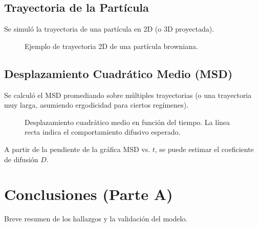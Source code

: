 \documentclass[11pt,a4paper]{article}
\begin{document}
\subsection{Trayectoria de la Partícula}
Se simuló la trayectoria de una partícula en 2D (o 3D proyectada).
\begin{figure}[h!]
    \centering
    \caption{Ejemplo de trayectoria 2D de una partícula browniana.}
    \label{fig:trayectoria}
\end{figure}

\subsection{Desplazamiento Cuadrático Medio (MSD)}
Se calculó el MSD promediando sobre múltiples trayectorias (o una trayectoria muy larga, asumiendo ergodicidad para ciertos regímenes).
\begin{figure}[h!]
    \centering
    \caption{Desplazamiento cuadrático medio en función del tiempo. La línea recta indica el comportamiento difusivo esperado.}
    \label{fig:msd}
\end{figure}
A partir de la pendiente de la gráfica MSD vs. $t$, se puede estimar el coeficiente de difusión $D$.

\section{Conclusiones (Parte A)}
Breve resumen de los hallazgos y la validación del modelo.

% 
% 
\end{document}
